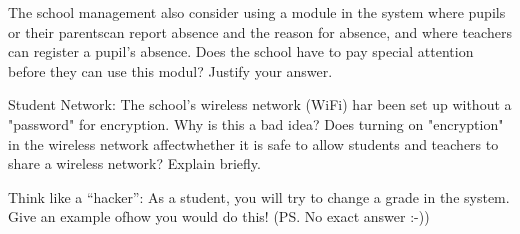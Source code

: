 \documentclass{myassignment}
\begin{document}
	\begin{answer}

	\end{answer}

	\begin{problem}
		The school management also consider using a module in the system where pupils or their parentscan report absence and the reason for absence, and where teachers can register a pupil’s absence. Does the school have to pay special attention before they can use this modul? Justify your answer.
	\end{problem}

	\begin{answer}

	\end{answer}

	\begin{problem}
		Student Network: The school’s wireless network (WiFi) har been set up without a "password" for encryption. Why is this a bad idea? Does turning on "encryption" in the wireless network affectwhether it is safe to allow students and teachers to share a wireless network? Explain briefly.
	\end{problem}

	\begin{answer}

	\end{answer}

	\begin{problem}
		Think like a ``hacker'': As a student, you will try to change a grade in the system. Give an example ofhow you would do this! (PS. No exact answer :-))
	\end{problem}

	\begin{answer}

	\end{answer}
\end{document}

